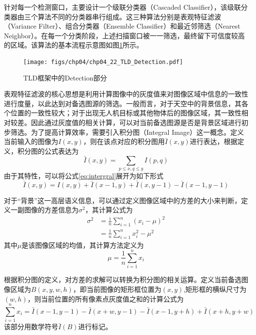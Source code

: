 针对每一个检测窗口，主要设计一个级联分类器（Cascaded Classifier），该级联分类器由三个算法不同的分类器串行组成。这三种算法分别是表观特征滤波（Variance Filter）、组合分类器（Ensemble Classifier）和最近邻筛选（Nearest Neighbor）。在每一个分类阶段，上述扫描窗口被一一筛选，最终留下可信度较高的区域。该算法的基本流程示意图如图\ref{fig:chp04_22_TLD_Detection}所示。
\begin{figure}[ht]   
	\centering
	\texttt{[image: figs/chp04/chp04\_22\_TLD\_Detection.pdf]}
	\caption{TLD框架中的Detection部分}
	\label{fig:chp04_22_TLD_Detection}
\end{figure}


表观特征滤波的核心思想是利用计算图像中的灰度值来对图像区域中信息的一致性进行度量，以此达到对备选图源的筛选。一般而言，对于天空中的背景信息，其各个位置的一致性较大；对于出现无人机目标或其他物体后的图像区域，其一致性相对较差。因此通过灰度值的相关计算，可以对当前备选图源是否是背景区域进行初步筛选。为了提高计算效率，需要引入积分图（Integral Image）这一概念。定义当前输入的图像为$I(x,y)$，则在该点对应的积分图用$\bar{I}(x,y) $进行表达，根据定义，积分图的公式表达为
\begin{equation}
\label{eq:intergral}
\bar{I}(x,y) = \sum_{p \le x, q \le y}I(p,q)
\end{equation}
由于其特性，可以将公式\ref{eq:intergral}展开为如下形式
\begin{equation}
\bar{I}(x,y) = I(x,y) + \bar{I}(x-1, y) + \bar{I}(x, y-1) - \bar{I}(x-1, y-1)
\end{equation}

对于“背景”这一高层语义信息，可以通过定义图像区域中的方差的大小来判断，定义一副图像的方差信息为$\sigma^2$，其计算公式为
\begin{align}
\label{eq:variance_integral}
\sigma^2&=\frac{1}{n}\sum_{i=1}^n(x_i-\mu)^2 \\
&=\frac{1}{n}\sum_{i=1}^nx_i^2-\mu^2
\end{align}
其中$\mu$是该图像区域的均值，其计算方法定义为
\begin{equation}
\mu=\frac{1}{n}\sum_{i=1}^nx_i
\end{equation}

根据积分图的定义，对方差的求解可以转换为积分图的相关运算。定义当前备选图像区域为$B(x,y,w,h)$，即当前图像的矩形框位置为$(x,y)$,矩形框的横纵尺寸为$(w,h)$，则当前位置的所有像素点灰度值之和的计算公式为
\begin{equation}
\label{eq:variance_x}
\sum_{i=1}^nx_i = \bar{I}(x-1, y-1)-\bar{I}(x+w,y-1)-\bar{I}(x-1,y+h)+\bar{I}(x+h,y+w)
\end{equation}
该部分用数学符号$\bar{I}(B)$进行标记。

